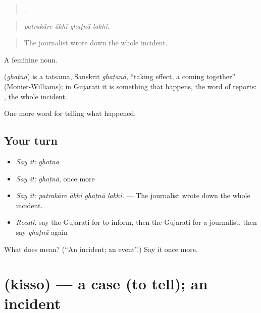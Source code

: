 \begin{quote}
   .
\end{quote}

\begin{quote}
\emph{patrakāre ākhī ghaṭnā lakhī.}
\end{quote}

\begin{quote}
The journalist wrote down the whole incident.
\end{quote}

A feminine noun.

\begin{cousinweb}
\textbf{} (\emph{ghaṭnā}) is a tatsama, Sanskrit \emph{ghaṭanā}, \textquotedblleft{}taking effect, a coming together\textquotedblright{} (Monier-Williams); in Gujarati it is something that happens, the word of reports: \textbf{ }, the whole incident.
\end{cousinweb}

\begin{grammarlens}[title={What you've built}]
One more word for telling what happened.
\end{grammarlens}

\subsection*{Your turn}
\begin{itemize}
\raggedright
  \item \emph{Say it:} \emph{ghaṭnā}
  \item \emph{Say it:} \emph{ghaṭnā}, once more
  \item \emph{Say it:} \emph{patrakāre ākhī ghaṭnā lakhī.} — The journalist wrote down the whole incident.
  \item \emph{Recall:} say the Gujarati for to inform, then the Gujarati for a journalist, then say \emph{ghaṭnā} again
\end{itemize}

\begin{tcolorbox}[breakable,colback=teal!4,colframe=teal!35!black,title={Before you move on}]
What does  mean? (\textquotedblleft{}An incident; an event\textquotedblright{}.) Say it once more.
\end{tcolorbox}
\section[\texorpdfstring{\gu{કિસ્સો} (kisso)}{કિસ્સો (kisso)}]{ (kisso) — a case (to tell); an incident}

